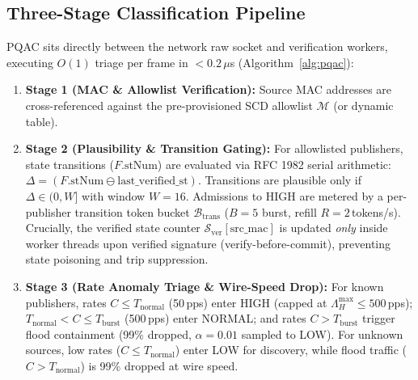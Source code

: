 \documentclass[journal]{IEEEtran}
\begin{document}
\subsection{Three-Stage Classification Pipeline}
PQAC sits directly between the network raw socket and verification workers, executing $O(1)$ triage per frame in $<0.2\,\mu$s (Algorithm~\ref{alg:pqac}):
\begin{enumerate}[leftmargin=*,noitemsep,topsep=1pt]
    \item \textbf{Stage 1 (MAC \& Allowlist Verification):} Source MAC addresses are cross-referenced against the pre-provisioned SCD allowlist $\mathcal{M}$ (or dynamic table).
    \item \textbf{Stage 2 (Plausibility \& Transition Gating):} For allowlisted publishers, state transitions ($F.\text{stNum}$) are evaluated via RFC 1982 serial arithmetic: $\Delta = (F.\text{stNum} \ominus \text{last\_verified\_st})$. Transitions are plausible only if $\Delta \in (0, W]$ with window $W = 16$. Admissions to HIGH are metered by a per-publisher transition token bucket $\mathcal{B}_{\text{trans}}$ ($B = 5$ burst, refill $R = 2$\,tokens/s). Crucially, the verified state counter $\mathcal{S}_{\text{ver}}[\text{src\_mac}]$ is updated \emph{only} inside worker threads upon verified signature (verify-before-commit), preventing state poisoning and trip suppression.
    \item \textbf{Stage 3 (Rate Anomaly Triage \& Wire-Speed Drop):} For known publishers, rates $C \le T_{\text{normal}}$ (50\,pps) enter HIGH (capped at $\Lambda_H^{\max} \le 500$\,pps); $T_{\text{normal}} < C \le T_{\text{burst}}$ (500\,pps) enter NORMAL; and rates $C > T_{\text{burst}}$ trigger flood containment (99\% dropped, $\alpha = 0.01$ sampled to LOW). For unknown sources, low rates ($C \le T_{\text{normal}}$) enter LOW for discovery, while flood traffic ($C > T_{\text{normal}}$) is 99\% dropped at wire speed.
\end{enumerate}
\end{document}
